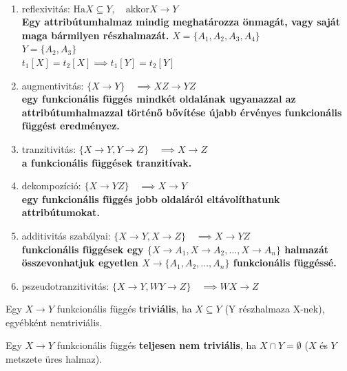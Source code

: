 \begin{theorem}~\\
	\begin{enumerate}[nosep]
		\item reflexivitás: $\text{Ha} X\subseteq Y,\quad \text{akkor} X \to Y$\\
		{\small\bfseries Egy attribútumhalmaz mindig meghatározza önmagát, vagy saját maga bármilyen részhalmazát.}
		{\footnotesize $X = \{A_1,A_2,A_3,A_4\}$\\
			$Y = \{A_2,A_3\}$\\
			$t_1[X] = t_2[X] \implies t_1[Y]=t_2[Y]$}
		\item augmentivitás: $\{X\to Y\}\quad \implies XZ \to YZ $\\
		{\small\bfseries egy funkcionális függés mindkét oldalának ugyanazzal az attribútumhalmazzal történő bővítése újabb érvényes funkcionális függést eredményez.}
		
		\item tranzitivitás: $\{X \to Y,Y \to Z\}\quad \implies X \to Z$\\
		{\small\bfseries a funkcionális függések tranzitívak.}
		\item dekompozíció: $\{X \to YZ\}\quad \implies X \to Y$\\
		{\small\bfseries egy funkcionális függés jobb oldaláról eltávolíthatunk attribútumokat.}
		\item additivitás szabályai: $\{X \to Y,X \to Z\}\quad \implies X \to YZ$\\
		{\small\bfseries funkcionális függések egy $\{X \to A_1 ,X \to A_2 ,\dots,X \to A_n \}$ halmazát összevonhatjuk egyetlen $X \to \{A_1 ,A_2 ,\dots,A_n \}$ funkcionális függéssé.}
		\item pszeudotranzitivitás: $\{X \to Y,WY \to Z\}\quad \implies WX \to Z$\\
	\end{enumerate}
\end{theorem}
\begin{definition}
	Egy $X \to Y$ funkcionális függés \textbf{triviális}, ha $X \subseteq Y$ (Y részhalmaza X-nek), egyébként nemtriviális.
\end{definition}
\begin{theorem}
	Egy $X \to Y$ funkcionális függés \textbf{teljesen nem triviális}, ha $X\cap Y=\emptyset$ ($X$ és $Y$ metszete üres halmaz).
\end{theorem}

